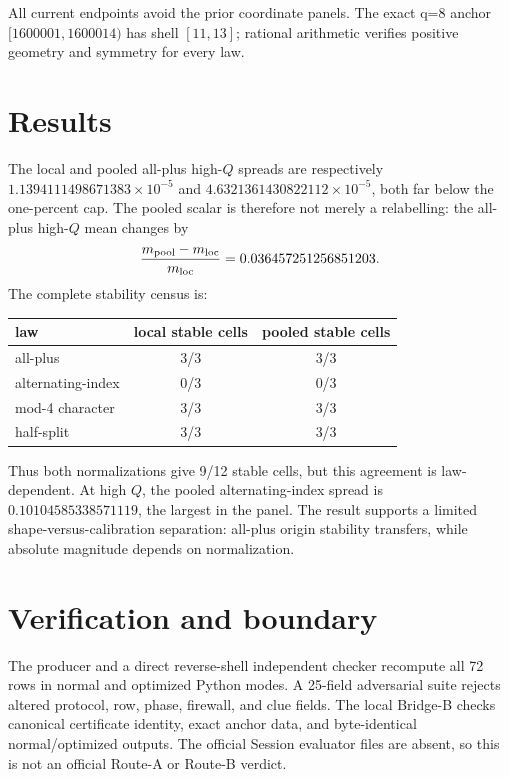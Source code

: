 \documentclass[10pt]{article}
\begin{document}
All current endpoints avoid the prior coordinate panels.  The exact q=8
anchor \([1600001,1600014)\) has shell \([11,13]\); rational arithmetic
verifies positive geometry and symmetry for every law.

\section{Results}

The local and pooled all-plus high-\(Q\) spreads are respectively
\(1.1394111498671383\times10^{-5}\) and
\(4.6321361430822112\times10^{-5}\), both far below the one-percent cap.
The pooled scalar is therefore not merely a relabelling: the all-plus high-\(Q
\) mean changes by
\[
 \frac{m_{\rm pool}-m_{\rm loc}}{m_{\rm loc}}
 =0.036457251256851203.
\]
The complete stability census is:

\begin{center}
\small
\begin{tabular}{lcc}
\toprule
law & local stable cells & pooled stable cells\\
\midrule
all-plus & 3/3 & 3/3\\
alternating-index & 0/3 & 0/3\\
mod-4 character & 3/3 & 3/3\\
half-split & 3/3 & 3/3\\
\bottomrule
\end{tabular}
\end{center}

Thus both normalizations give 9/12 stable cells, but this agreement is
law-dependent.  At high \(Q\), the pooled alternating-index spread is
\(0.10104585338571119\), the largest in the panel.  The result supports a
limited shape-versus-calibration separation: all-plus origin stability
transfers, while absolute magnitude depends on normalization.

\section{Verification and boundary}

The producer and a direct reverse-shell independent checker recompute all 72
rows in normal and optimized Python modes.  A 25-field adversarial suite
rejects altered protocol, row, phase, firewall, and clue fields.  The local
Bridge-B checks canonical certificate identity, exact anchor data, and
byte-identical normal/optimized outputs.  The official Session evaluator files
are absent, so this is not an official Route-A or Route-B verdict.
\end{document}
